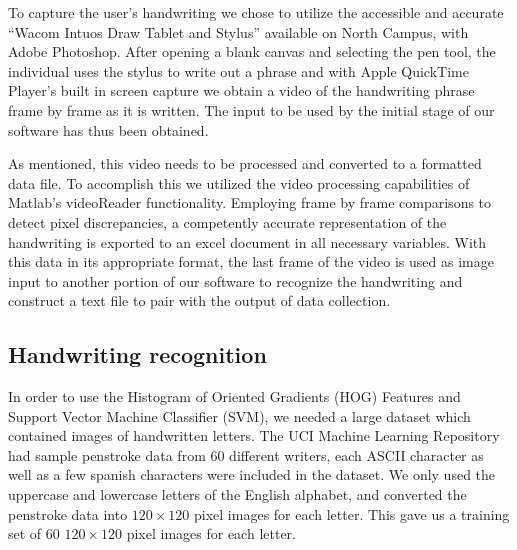 \documentclass{article} %
\begin{document}
To capture the user’s handwriting we chose to utilize the accessible and accurate “Wacom Intuos Draw Tablet and Stylus” available on North Campus, with Adobe Photoshop. After opening a blank canvas and selecting the pen tool, the individual uses the stylus to write out a phrase and with Apple QuickTime Player’s built in screen capture we obtain a video of the handwriting phrase frame by frame as it is written. The input to be used by the initial stage of our software has thus been obtained. 

As mentioned, this video needs to be processed and converted to a formatted data file. To accomplish this we utilized the video processing capabilities of Matlab’s videoReader functionality. Employing frame by frame comparisons to detect pixel discrepancies, a competently accurate representation of the handwriting is exported to an excel document in all necessary variables. With this data in its appropriate format, the last frame of the video is used as image input to another portion of our software to recognize the handwriting and construct a text file to pair with the output of data collection.

\subsection{Handwriting recognition}

In order to use the Histogram of Oriented Gradients (HOG) Features and Support Vector Machine Classifier (SVM), we needed a large dataset which contained images of handwritten letters. The UCI Machine Learning Repository had sample penstroke data from 60 different writers, each ASCII character as well as a few spanish characters were included in the dataset. We only used the uppercase and lowercase letters of the English alphabet, and converted the penstroke data into $120\times 120$ pixel images for each letter. This gave us a training set of 60 $120\times 120$ pixel images for each letter.
\end{document}

